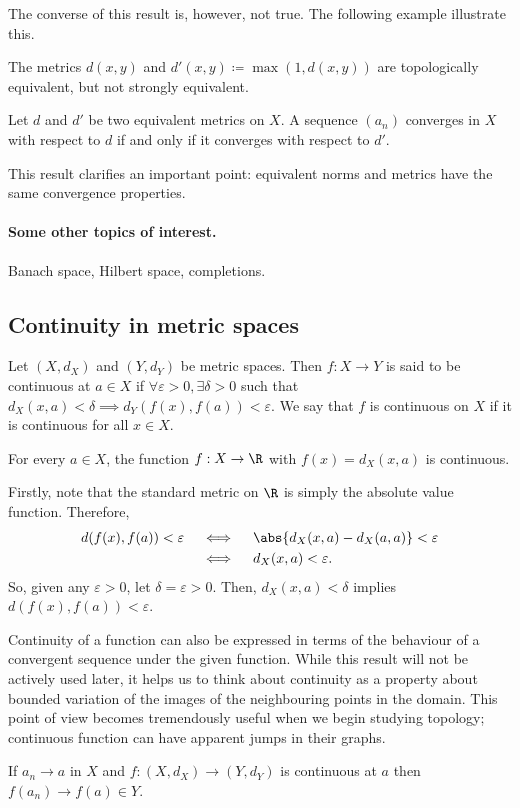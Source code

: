 The converse of this result is, however, not true. The following example illustrate this.
\begin{negg}
  The metrics $d(x,y)$ and $d'(x,y) \coloneq \max\left(1, d(x,y)\right)$ are topologically equivalent, but not strongly equivalent.\eggqed
\end{negg}

\begin{nprop}
  Let $d$ and $d'$ be two equivalent metrics on $X$. A sequence $(a_n)$ converges in $X$ with respect to $d$ if and only if it converges with respect to $d'$.
\end{nprop}
This result clarifies an important point: equivalent norms and metrics have the same convergence properties.


\paragraph{Some other topics of interest.} Banach space, Hilbert space, completions.


\subsection{Continuity in metric spaces}
\begin{ndfn}
  Let $(X, d_X)$ and $(Y, d_Y)$ be metric spaces. Then $f:X \to Y$ is said to be continuous at $a \in X$ if $\forall \varepsilon>0, \exists \delta>0$ such that $d_{X}(x,a) < \delta \implies d_{Y}(f(x), f(a)) < \varepsilon$. We say that $f$ is continuous on $X$ if it is continuous for all $x \in X$.
\end{ndfn}

\begin{negg}
  For every $a \in X$, the function $f:X \to \R$ with $f(x)=d_{X}(x,a)$ is continuous.

  Firstly, note that the standard metric on $\R$ is simply the absolute value function. Therefore,
  \begin{align*}
    d(f(x), f(a)) < \varepsilon
    &\quad\iff\quad \abs{d_{X}(x,a) - d_{X}(a,a)} < \varepsilon\\
    &\quad\iff\quad d_{X}(x,a) < \varepsilon.
  \end{align*}
  So, given any $\varepsilon > 0$, let $\delta = \varepsilon > 0$. Then, $d_{X}(x,a) < \delta$ implies $d(f(x), f(a)) < \varepsilon$.\eggqed
\end{negg}

Continuity of a function can also be expressed in terms of the behaviour of a convergent sequence under the given function. While this result will not be actively used later, it helps us to think about continuity as a property about bounded variation of the images of the neighbouring points in the domain. This point of view becomes tremendously useful when we begin studying topology; continuous function can have apparent jumps in their graphs.
\begin{nlemma}
  If $a_n \to a$ in $X$ and $f:(X, d_X) \to (Y, d_Y)$ is continuous at $a$ then $f(a_n) \to f(a) \in Y$.
\end{nlemma}

